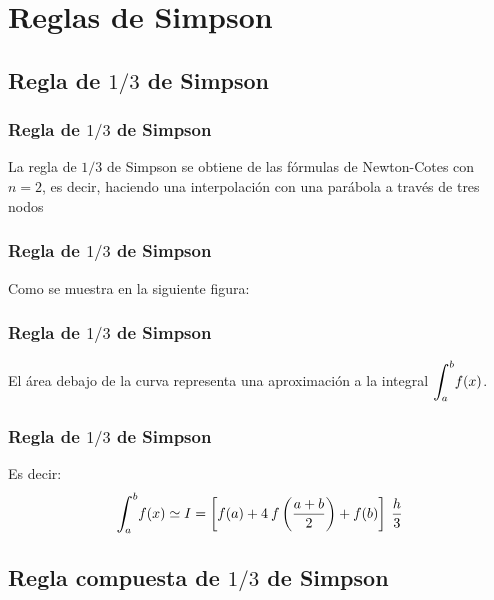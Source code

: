 \documentclass[12pt]{beamer}
\begin{document}
\section{Reglas de Simpson}
\subsection{Regla de $1/3$ de Simpson}

\begin{frame}
\frametitle{Regla de $1/3$ de Simpson}
La regla de $1/3$ de Simpson se obtiene de las fórmulas de Newton-Cotes con $n = 2$, \pause es decir, haciendo una interpolación con una parábola a través de tres nodos
\end{frame}
\begin{frame}
\frametitle{Regla de $1/3$ de Simpson}
Como se muestra en la siguiente figura:
\begin{figure}
	\centering
	
\end{figure}
\end{frame}
\begin{frame}
\frametitle{Regla de $1/3$ de Simpson}
\begin{figure}
	\centering
	
\end{figure}
El área debajo de la curva representa una aproximación a la integral $\scaleint{6ex}_{\bs a}^{b} f (x)$.
\end{frame}
\begin{frame}
\frametitle{Regla de $1/3$ de Simpson}
Es decir:
\begin{align*}
\scaleint{6ex}_{\bs a}^{b} f (x) \simeq I = \left[ f (a) + 4 \: f \left( \dfrac{a + b}{2} \right) + f (b) \right] \: \dfrac{h}{3}
\end{align*}
\end{frame}

\subsection{Regla compuesta de \texorpdfstring{$1/3$}{1/3} de Simpson}
\end{document}
